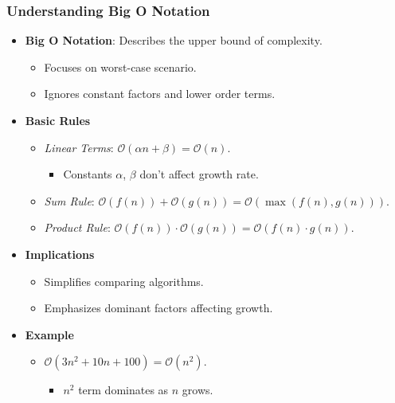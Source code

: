 \documentclass[compress,12pt]{beamer}
\begin{document}
\begin{frame}
    \frametitle{Understanding Big O Notation}

    \begin{itemize}
        \item \textbf{Big O Notation}: Describes the upper bound of complexity.
              \begin{itemize}
                  \item Focuses on worst-case scenario.
                  \item Ignores constant factors and lower order terms.
              \end{itemize}
        \item \textbf{Basic Rules}
              \begin{itemize}
                  \item \textit{Linear Terms}: $\mathcal{O}(\alpha n + \beta) = \mathcal{O}(n)$.
                        \begin{itemize}
                            \item Constants $\alpha$, $\beta$ don't affect growth rate.
                        \end{itemize}
                  \item \textit{Sum Rule}: $\mathcal{O}(f(n)) + \mathcal{O}(g(n)) = \mathcal{O}(\max(f(n), g(n)))$.
                  \item \textit{Product Rule}: $\mathcal{O}(f(n)) \cdot \mathcal{O}(g(n)) = \mathcal{O}(f(n) \cdot g(n))$.
              \end{itemize}
        \item \textbf{Implications}
              \begin{itemize}
                  \item Simplifies comparing algorithms.
                  \item Emphasizes dominant factors affecting growth.
              \end{itemize}
        \item \textbf{Example}
              \begin{itemize}
                  \item $\mathcal{O}(3n^2 + 10n + 100) = \mathcal{O}(n^2)$.
                        \begin{itemize}
                            \item $n^2$ term dominates as $n$ grows.
                        \end{itemize}
              \end{itemize}
    \end{itemize}
\end{frame}
\end{document}
